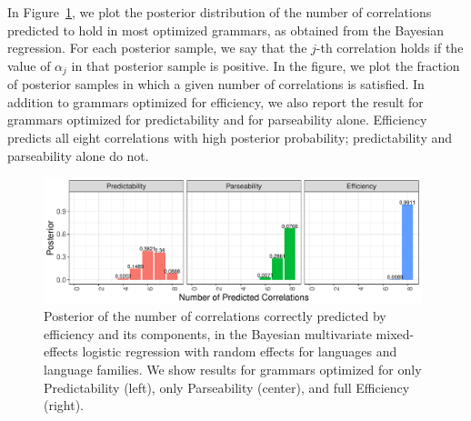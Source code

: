 \documentclass[10pt,twoside,lineno]{article}
\begin{document}
In Figure~\ref{fig:posterior}, we plot the posterior distribution of the number of correlations predicted to hold in most optimized grammars, as obtained from the Bayesian regression.
For each posterior sample, we say that the $j$-th correlation holds if the value of $\alpha_j$ in that posterior sample is positive.
In the figure, we plot the fraction of posterior samples in which a given number of correlations is satisfied.
In addition to grammars optimized for efficiency, we also report the result for grammars optimized for predictability and for parseability alone.
Efficiency predicts all eight correlations with high posterior probability; predictability and parseability alone do not.

\begin{figure}[ht]
	\begin{center}
	\includegraphics[width=0.98\textwidth]{../results/correlations/figures/posterior-satisfied-universals-together-large-three.pdf}
	\end{center}
	\caption{Posterior of the number of correlations correctly predicted by efficiency and its components, in the Bayesian multivariate mixed-effects logistic regression with random effects for languages and language families. We show results for grammars optimized for only Predictability (left), only Parseability (center), and full Efficiency (right).}\label{fig:posterior}
\end{figure}


%    
%    
%    
\end{document}
